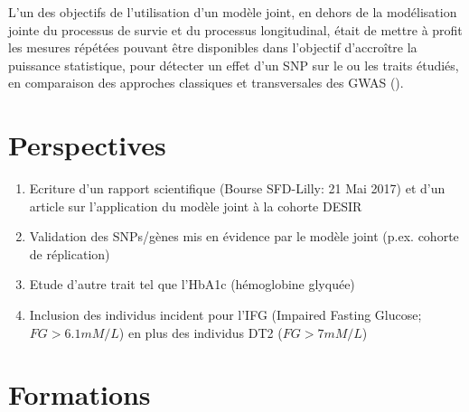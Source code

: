 \documentclass[11pt, a4paper]{article}
\begin{document}
\newpage
\par{L'un des objectifs de l'utilisation d'un modèle joint, en dehors de la modélisation jointe du processus de survie et du processus longitudinal,
était de mettre à profit les mesures répétées pouvant être disponibles dans l'objectif d'accroître la puissance statistique, pour détecter un effet d'un SNP sur le ou les traits étudiés,
en comparaison des approches classiques et transversales des GWAS ().}
\begin{table}[h]
    \begin{center}
        {\small}
        \label{tab:tab2}
    \end{center}
\end{table}


\clearpage
\section{Perspectives}
\par{
\begin{enumerate}
    \item Ecriture d’un rapport scientifique (Bourse SFD-Lilly: 21 Mai 2017) et d'un article sur l'application du modèle joint à la cohorte DESIR
    \item Validation des SNPs/gènes mis en évidence par le modèle joint (p.ex. cohorte de réplication)
    \item Etude d'autre trait tel que l'HbA1c (hémoglobine glyquée)
    \item Inclusion des individus incident pour l'IFG (Impaired Fasting Glucose; $FG>6.1mM/L$) en plus des individus DT2 ($FG>7mM/L$)
\end{enumerate}
}


\clearpage
\section{Formations}
\end{document}
